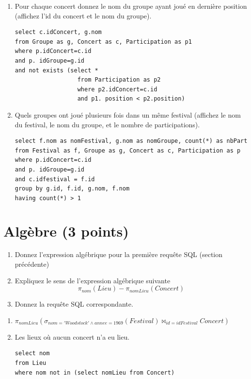 \begin{enumerate}
\item Pour chaque concert donnez le nom du groupe ayant joué en dernière position (affichez l'id du concert
et le nom du groupe).

\begin{solution}
\begin{verbatim}
select c.idConcert, g.nom
from Groupe as g, Concert as c, Participation as p1
where p.idConcert=c.id
and p. idGroupe=g.id
and not exists (select * 
                  from Participation as p2 
                  where p2.idConcert=c.id
                  and p1. position < p2.position)
\end{verbatim}
\end{solution}


\item Quels groupes ont joué plusieurs fois dans un même festival (affichez le nom
du festival, le nom du groupe, et le nombre de participations).

\begin{solution}
\begin{verbatim}
select f.nom as nomFestival, g.nom as nomGroupe, count(*) as nbPart
from Festival as f, Groupe as g, Concert as c, Participation as p
where p.idConcert=c.id
and p. idGroupe=g.id
and c.idfestival = f.id
group by g.id, f.id, g.nom, f.nom
having count(*) > 1
\end{verbatim}
\end{solution}
\end{enumerate}


\section{Algèbre (3 points)}

\begin{enumerate}
   \item Donnez l'expression algébrique pour la première requête SQL (section précédente)

   \item Expliquez le sens de l'expression algébrique suivante
       $$\pi_{nom} (Lieu) - \pi_{nomLieu} (Concert)$$
\item Donnez la requête SQL correspondante.
\end{enumerate}


\begin{solution}

\begin{enumerate}
\item $\pi_{nomLieu} (\sigma_{nom='Woodstock' \land annee=1969} (Festival) \Join_{id=idFestival} Concert)$ 

   \item Les lieux où aucun concert n'a eu lieu.


\begin{verbatim}
select nom
from Lieu 
where nom not in (select nomLieu from Concert)
\end{verbatim}
\end{enumerate}

\end{solution}


